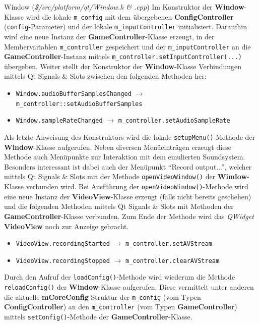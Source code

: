 \documentclass[11pt,a4paper]{scrartcl}
\begin{document}
\vspace{5mm}
\large Window \normalsize(\textit{\$/src/platform/qt/Window.h \& .cpp})
\vspace{2mm}\newline
Im Konstruktor der \textbf{Window}-Klasse wird die lokale \verb|m_config| mit dem \"ubergebenen \textbf{ConfigController} (\verb|config|-Parameter) und der lokale \verb|m_inputController| initialisiert. Daraufhin wird eine neue Instanz der \textbf{GameController}-Klasse erzeugt, in der Membervariablen \verb|m_controller| gespeichert und der \verb|m_inputController| an die \textbf{GameController}-Instanz mittels \verb|m_controller.setInputController(...)| \"ubergeben. Weiter stellt der Konstruktor der \textbf{Window}-Klasse Verbindungen mittels Qt Signals \& Slots zwischen den folgenden Methoden her:

\begin{itemize}
    \item \verb|Window.audioBufferSamplesChanged| $\rightarrow$ \verb|m_controller::setAudioBufferSamples|
    \item \verb|Window.sampleRateChanged| $\rightarrow$ \verb|m_controller.setAudioSampleRate|
\end{itemize}

Als letzte Anweisung des Konstruktors wird die lokale \verb|setupMenu()|-Methode der \textbf{Window}-Klasse aufgerufen. Neben diversen Men\"ueintr\"agen erzeugt diese Methode auch Men\"upunkte zur Interaktion mit dem emulierten Soundsystem. Besonders interessant ist dabei auch der Men\"upunkt \enquote{Record output...}, welcher mittels Qt Signals \& Slots mit der Methode \verb|openVideoWindow()| der \textbf{Window}-Klasse verbunden wird. Bei Ausf\"uhrung der \verb|openVideoWindow()|-Methode wird eine neue Instanz der \textbf{VideoView}-Klasse erzeugt (falls nicht bereits geschehen) und die folgenden Methoden mittels Qt Signals \& Slots mit Methoden der \textbf{GameController}-Klasse verbunden. Zum Ende der Methode wird das \textit{QWidget} \textbf{VideoView} noch zur Anzeige gebracht.

\begin{itemize}
    \item \verb|VideoView.recordingStarted| $\rightarrow$ \verb|m_controller.setAVStream|
    \item \verb|VideoView.recordingStopped| $\rightarrow$ \verb|m_controller.clearAVStream|
\end{itemize}


Durch den Aufruf der \verb|loadConfig()|-Methode wird wiederum die Methode \verb|reloadConfig()| der \textbf{Window}-Klasse aufgerufen. Diese vermittelt unter anderen die aktuelle \textbf{mCoreConfig}-Struktur der \verb|m_config| (vom Typen \textbf{ConfigController}) an den \verb|m_controller| (vom Typen \textbf{GameController}) mittels \verb|setConfig()|-Methode der \textbf{GameController}-Klasse.
\end{document}
